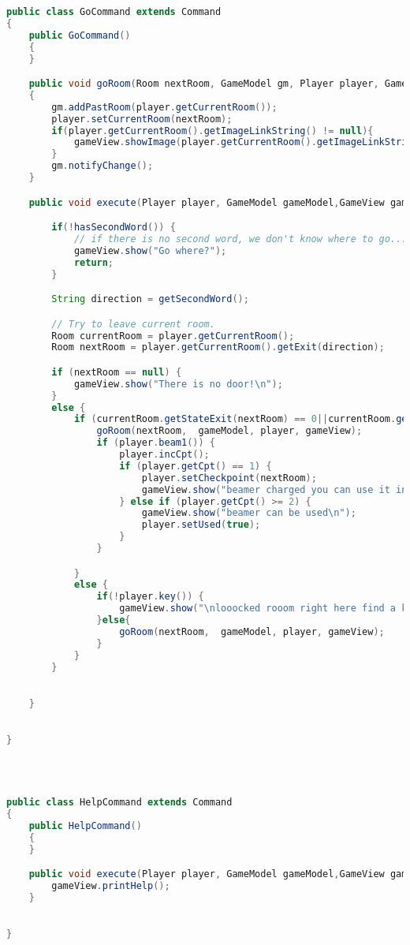 \documentclass[a4paper , 10pt]{article}
\begin{document}
\begin{lstlisting}[language=Java, caption={Gocommand}]
public class GoCommand extends Command
{
    public GoCommand()
    {
    }

    public void goRoom(Room nextRoom, GameModel gm, Player player, GameView gameView)
    {
        gm.addPastRoom(player.getCurrentRoom());
        player.setCurrentRoom(nextRoom);
        if(player.getCurrentRoom().getImageLinkString() != null){
            gameView.showImage(player.getCurrentRoom().getImageLinkString());
        }
        gm.notifyChange();
    }

    public void execute(Player player, GameModel gameModel,GameView gameView){

        if(!hasSecondWord()) {
            // if there is no second word, we don't know where to go...
            gameView.show("Go where?");
            return;
        }

        String direction = getSecondWord();

        // Try to leave current room.
        Room currentRoom = player.getCurrentRoom();
        Room nextRoom = player.getCurrentRoom().getExit(direction);

        if (nextRoom == null) {
            gameView.show("There is no door!\n");
        }
        else {
            if (currentRoom.getStateExit(nextRoom) == 0||currentRoom.getStateExit(nextRoom) == 1 ) {
                goRoom(nextRoom,  gameModel, player, gameView);
                if (player.beam1()) {
                    player.incCpt();
                    if (player.getCpt() == 1) {
                        player.setCheckpoint(nextRoom);
                        gameView.show("beamer charged you can use it in the next room");
                    } else if (player.getCpt() >= 2) {
                        gameView.show("beamer can be used\n");
                        player.setUsed(true);
                    }
                }

            }
            else {
                if(!player.key()) {
                    gameView.show("\nlooocked rooom right here find a key to open it\n");
                }else{
                    goRoom(nextRoom,  gameModel, player, gameView);
                }
            }
        }

    
    }

    
}





\end{lstlisting}
\begin{lstlisting}[language=Java, caption={Helpcommand}]
    public class HelpCommand extends Command
{
    public HelpCommand()
    {
    }

    public void execute(Player player, GameModel gameModel,GameView gameView){
        gameView.printHelp();
    }

    
}

\end{lstlisting}
\end{document}
